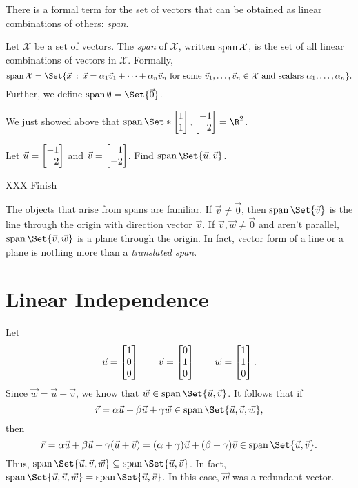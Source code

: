 There is a formal term for the set of vectors that can be obtained as linear combinations
of others: \emph{span}.

\begin{definition}[Span]
	Let $\mathcal X$ be a set of vectors. The \emph{span} of $\mathcal X$, written $\operatorname{span} \mathcal X$,
	is the set of all linear combinations of vectors in $\mathcal X$. Formally,
	\[
	\Span \mathcal X = \Set{\vec x\given \vec x = \alpha_1\vec v_1+
	\cdots+\alpha_n\vec v_n\text{ for some }\vec v_1,\ldots,\vec v_n\in\mathcal X
	\text{ and scalars }\alpha_1,\ldots,\alpha_n}.
	\]
	Further, we define $\Span\emptyset =\Set{\vec 0}$.
\end{definition}

We just showed above that $\Span\Set*{\mat{1\\1},\mat{-1\\2}}=\R^2$.

\begin{example}
	Let $\vec u=\mat{-1\\2}$ and $\vec v=\mat{1\\-2}$. Find $\Span\Set{\vec u,\vec v}$.

	XXX Finish
\end{example}

The objects that arise from spans are familiar. If $\vec v\neq\vec 0$, then $\Span\Set{\vec v}$
is the line through the origin with direction vector $\vec v$. If $\vec v,\vec w\neq \vec 0$ and
aren't parallel, $\Span\Set{\vec v,\vec w}$ is a plane through the origin. In fact, vector form of
a line or a plane is nothing more than a \emph{translated span}.

\section{Linear Independence}

Let
\[
	\vec u=\mat{1\\0\\0}\qquad\vec v=\mat{0\\1\\0}\qquad \vec w=\mat{1\\1\\0}.
\]
Since $\vec w=\vec u+\vec v$, we know that $\vec w\in\Span\Set{\vec u,\vec v}$. It follows
that if 
\[
	\vec r=\alpha\vec u+\beta\vec u+\gamma\vec w\in\Span\Set{\vec u,\vec v,\vec w},
\] then
\[
	\vec r=\alpha\vec u+\beta\vec u+\gamma(\vec u+\vec v) 
	= (\alpha+\gamma)\vec u+(\beta+\gamma)\vec v\in\Span\Set{\vec u,\vec v}.
\]
Thus, $\Span\Set{\vec u,\vec v,\vec w}\subseteq \Span\Set{\vec u,\vec v}$. In fact, 
$\Span\Set{\vec u,\vec v,\vec w}= \Span\Set{\vec u,\vec v}$. In this case, $\vec w$ was a redundant
vector.

